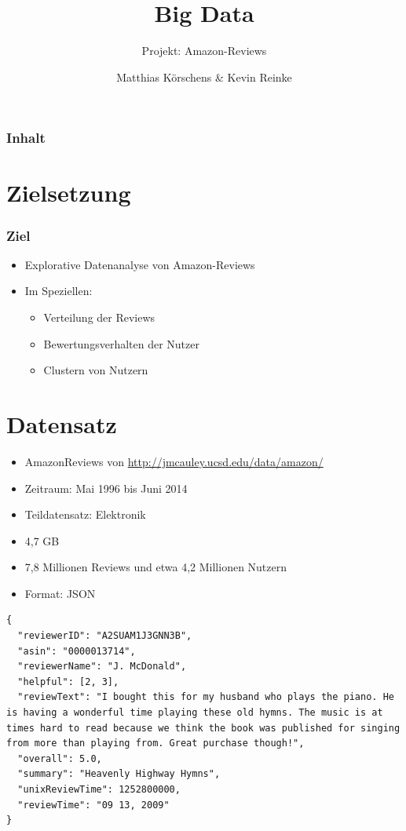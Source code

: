 \documentclass{beamer}
\title{Big Data}
\subtitle{Projekt: Amazon-Reviews}
\author[Nameshort]{Matthias Körschens \& Kevin Reinke}
\institute{Friedrich-Schiller-Universität Jena}
\begin{document}
	\nofooter{
		\frame{\titlepage}
	}
	\begin{frame}
		\frametitle{Inhalt}
		\tableofcontents
	\end{frame}
	\section{Zielsetzung}
	\begin{frame}
	\frametitle{Ziel}
	\begin{itemize}
		\item Explorative Datenanalyse von Amazon-Reviews
		\item Im Speziellen:
		\begin{itemize}
			\item Verteilung der Reviews
			\item Bewertungsverhalten der Nutzer
			\item Clustern von Nutzern
		\end{itemize}
	\end{itemize}
	\end{frame}
	\section{Datensatz}
	\begin{frame}
	\framesubsection{Allgemeines}
	\begin{itemize}
	\item AmazonReviews von \url{http://jmcauley.ucsd.edu/data/amazon/}
	\item Zeitraum: Mai 1996 bis Juni 2014
	\item Teildatensatz: Elektronik
	\item 4,7 GB
	\item 7,8 Millionen Reviews und etwa 4,2 Millionen Nutzern
	\item Format: JSON
	\end{itemize}
	\end{frame}
	\begin{frame}[containsverbatim]
	\framesubsection{Beispiel}
	\begin{lstlisting}[breaklines=true]
{ 
  "reviewerID": "A2SUAM1J3GNN3B", 
  "asin": "0000013714", 
  "reviewerName": "J. McDonald", 
  "helpful": [2, 3], 
  "reviewText": "I bought this for my husband who plays the piano. He is having a wonderful time playing these old hymns. The music is at times hard to read because we think the book was published for singing from more than playing from. Great purchase though!", 
  "overall": 5.0, 
  "summary": "Heavenly Highway Hymns", 
  "unixReviewTime": 1252800000, 
  "reviewTime": "09 13, 2009" 
}
	\end{lstlisting}  
	\end{frame}
\end{document}
